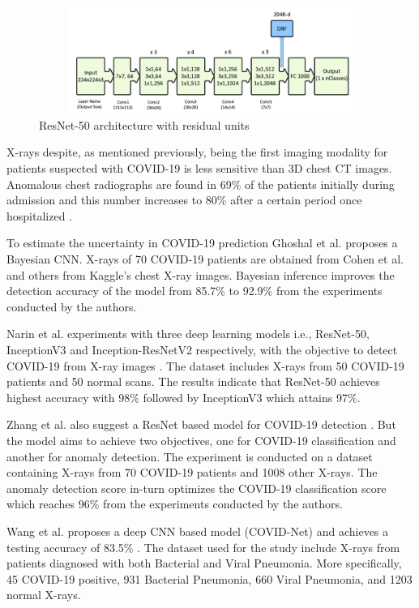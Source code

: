 \begin{figure}[H]
    \centering
    \includegraphics[width=15cm, height=3.5cm]{Images/ResNet.png}
    \caption[ResNet-50 Architecture]{ResNet-50 architecture with residual units \cite{MOB+2020}}
    \label{fig:ResNet-50 Architecture}
    \end{figure}
\vspace{-2em}
X-rays despite, as mentioned previously, being the first imaging modality for 
patients suspected with COVID-19 is less sensitive than 3D chest CT images. 
Anomalous chest radiographs are found in 69\% of the patients initially during 
admission and this number increases to 80\% after a certain period 
once hospitalized \cite{WLA+2020}.

To estimate the uncertainty in COVID-19 prediction Ghoshal et al. \cite{GHT2020} proposes 
a Bayesian CNN. X-rays of 70 COVID-19 patients are obtained 
from Cohen et al. \cite{JMD2020} and others from Kaggle's chest X-ray images. Bayesian 
inference improves the detection accuracy of the model from 85.7\% to 92.9\% from 
the experiments conducted by the authors.

Narin et al. experiments with three deep learning models 
i.e., ResNet-50, InceptionV3 and Inception-ResNetV2 respectively, with the objective 
to detect COVID-19 from X-ray images  \cite{AKP2020}. The dataset includes X-rays from 50 COVID-19 patients and 50 normal scans.
 The results indicate that ResNet-50 achieves highest accuracy with 98\% followed by InceptionV3 which 
attains 97\%.

Zhang et al. also suggest a ResNet based model for COVID-19 detection \cite{ZXS+2020}. 
But the model aims to achieve two objectives, one for COVID-19 classification and another for anomaly detection. The experiment is conducted on a dataset containing X-rays from 
70 COVID-19 patients and 1008 other X-rays. The anomaly detection score in-turn optimizes the COVID-19 
classification score which reaches 96\% from the experiments conducted by the authors.

Wang et al. proposes a deep CNN based model (COVID-Net) and
achieves a testing accuracy of 83.5\%  \cite{LWA2020}. The dataset used for the study include X-rays from 
patients diagnosed with both Bacterial and Viral Pneumonia. More specifically, 
45 COVID-19 positive, 931 Bacterial Pneumonia, 660 Viral Pneumonia, and 1203 normal X-rays.

